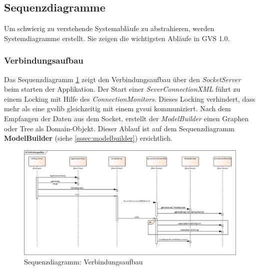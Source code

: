 \documentclass[11pt,a4paper,english,oneside]{book}
\numberwithin{equation}{chapter}
\begin{document}
	\subsection{Sequenzdiagramme} \label{ssec:sequence-1}
	Um schwierig zu verstehende Systemabläufe zu abstrahieren, werden Systemdiagramme erstellt. Sie zeigen die wichtigsten Abläufe in GVS 1.0.
	
	\subsubsection{Verbindungsaufbau}
	Das Sequenzdiagramm	\ref{fig:sd-verbindungsaufbau} zeigt den Verbindungsaufbau über den \textit{SocketServer} beim starten der Applikation. Der Start einer \textit{SeverConnectionXML} führt zu einem Locking mit Hilfe des \textit{ConnectionMonitors}. Dieses Locking verhindert, dass mehr als eine \gls{gvslib} gleichzeitig mit einem \gls{gvsui} kommuniziert. Nach dem Empfangen der Daten aus dem Socket, erstellt der \textit{ModelBuilder} einen Graphen oder Tree als Domain-Objekt. Dieser Ablauf ist auf dem Sequenzdiagramm \textbf{ModelBuilder} (siehe \ref{sssec:modelbuilder}) ersichtlich.
	\begin{figure}[h!]
		\centering
		\includegraphics[width=\linewidth]{assets/images/verbindungsaufbau}
		\caption{Sequenzdiagramm: Verbindungsaufbau}
		\label{fig:sd-verbindungsaufbau}
	\end{figure}
\end{document}
